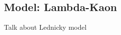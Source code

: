 \documentclass[../AnalysisNoteJBuxton.tex]{subfiles}
\begin{document}
\subsection{Model: Lambda-Kaon}
\label{ModelLambdaKaon}

Talk about Lednicky model
\end{document}
